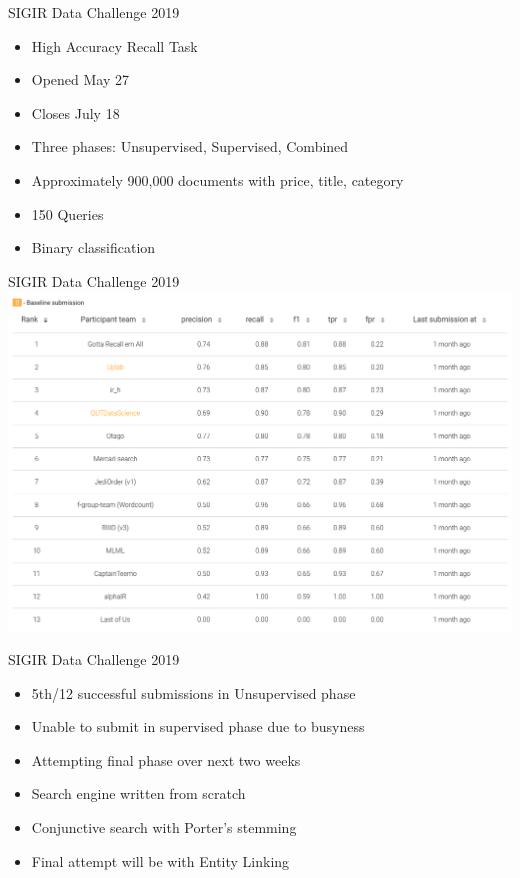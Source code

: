 \documentclass{beamer}
\begin{document}
\begin{frame}{SIGIR Data Challenge 2019}
	\begin{itemize}
		\item High Accuracy Recall Task
		\item Opened May 27
		\item Closes July 18
		\item Three phases: Unsupervised, Supervised, Combined
		\item Approximately 900,000 documents with price, title, category
		\item 150 Queries
		\item Binary classification
	\end{itemize}
\end{frame}

\begin{frame}{SIGIR Data Challenge 2019}
	\includegraphics[width=\linewidth]{data-challenge.png}
\end{frame}

\begin{frame}{SIGIR Data Challenge 2019}
	\begin{itemize}
		\item 5th/12 successful submissions in Unsupervised phase
		\item Unable to submit in supervised phase due to busyness
		\item Attempting final phase over next two weeks
		\item Search engine written from scratch
		\item Conjunctive search with Porter's stemming
		\item Final attempt will be with Entity Linking
	\end{itemize}
\end{frame}
\end{document}
